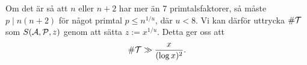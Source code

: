 
Om det är så att $n$ eller $n+2$ har mer än 7 primtalsfaktorer,
så måste $p\mid n(n+2)$ för något primtal $p\leq n^{1/u}$, där $u<8$.
Vi kan därför uttrycka $\card\mathcal{T}$ som $\S{A}{P}{z}$ genom att sätta $z := x^{1/u}$.
Detta ger oss att
\begin{equation*}
    \card\mathcal{T} \gg \frac{x}{(\log x)^2}.
\end{equation*}






\begin{comment}

två funktioner $g_U$ och $g_L$ som uppfyller 
\begin{alignat*}{3}
    g_U(1)&=1,\quad \text{och}&\quad \mu(d)(g_U(d)-g_U(pd)) &\geq 0, \\
    g_L(1)&=1,\quad \text{och}&\quad \mu(d)(g_L(d)-g_L(pd)) &\leq 0,
\end{alignat*}






\end{comment}